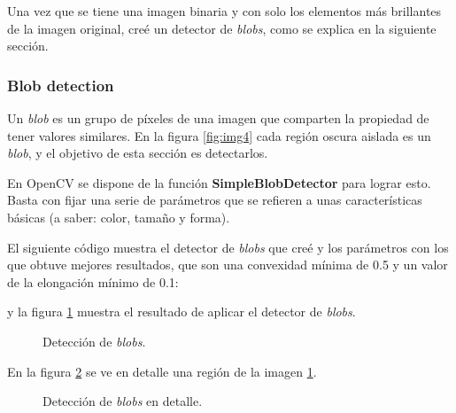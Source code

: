 \documentclass[a4paper,12pt]{article}
\begin{document}
Una vez que se tiene una imagen binaria y con solo los elementos más brillantes de la imagen original, creé un detector de \textit{blobs}, como se explica en la siguiente sección.

\subsubsection{Blob detection}

Un \textit{blob} es un grupo de píxeles de una imagen que comparten la propiedad de tener valores similares. En la figura \ref{fig:img4} cada región oscura aislada es un \textit{blob}, y el objetivo de esta sección es detectarlos.

En OpenCV se dispone de la función \textbf{SimpleBlobDetector} para lograr esto. Basta con fijar una serie de parámetros que se refieren a unas características básicas (a saber: color, tamaño y forma).

El siguiente código muestra el detector de \textit{blobs} que creé y los parámetros con los que obtuve mejores resultados, que son una convexidad mínima de 0.5 y un valor de la elongación mínimo de 0.1:


y la figura \ref{fig:img5} muestra el resultado de aplicar el detector de \textit{blobs}.
\begin{figure}[h!]
\centering
{}
\caption{Detección de \textit{blobs}.}
\label{fig:img5}
\end{figure}

En la figura \ref{fig:img6} se ve en detalle una región de la imagen \ref{fig:img5}.
\begin{figure}[h!]
\centering
{}
\caption{Detección de \textit{blobs} en detalle.}
\label{fig:img6}
\end{figure}
\end{document}
